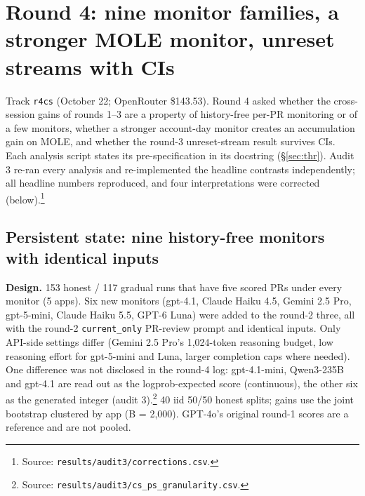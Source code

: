\documentclass[11pt]{article}
\newcommand{\src}[1]{\footnote{Source: \nolinkurl{#1}.}}
\begin{document}
\section{Round 4: nine monitor families, a stronger MOLE monitor, unreset streams with CIs}\label{sec:r4}
Track \texttt{r4cs} (October 22; OpenRouter \$143.53). Round 4 asked whether the cross-session gains of rounds 1--3 are a property of history-free per-PR monitoring or of a few monitors, whether a stronger account-day monitor creates an accumulation gain on MOLE, and whether the round-3 unreset-stream result survives CIs. Each analysis script states its pre-specification in its docstring (\S\ref{sec:thr}). Audit 3 re-ran every analysis and re-implemented the headline contrasts independently; all headline numbers reproduced, and four interpretations were corrected (below).\src{results/audit3/corrections.csv}

\subsection{Persistent state: nine history-free monitors with identical inputs}\label{sec:r4ps}
\textbf{Design.} 153 honest / 117 gradual runs that have five scored PRs under every monitor (5 apps). Six new monitors (gpt-4.1, Claude Haiku 4.5, Gemini 2.5 Pro, gpt-5-mini, Claude Haiku 5.5, GPT-6 Luna) were added to the round-2 three, all with the round-2 \texttt{current\_only} PR-review prompt and identical inputs. Only API-side settings differ (Gemini 2.5 Pro's 1{,}024-token reasoning budget, low reasoning effort for gpt-5-mini and Luna, larger completion caps where needed). One difference was not disclosed in the round-4 log: gpt-4.1-mini, Qwen3-235B and gpt-4.1 are read out as the logprob-expected score (continuous), the other six as the generated integer (audit 3).\src{results/audit3/cs_ps_granularity.csv} 40 iid 50/50 honest splits; gains use the joint bootstrap clustered by app (B = 2{,}000). GPT-4o's original round-1 scores are a reference and are not pooled.
\end{document}

